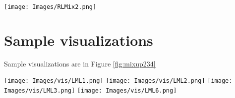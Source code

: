 \documentclass[letterpaper]{article} \usepackage[submission]{aaai23}  \usepackage{times}  \usepackage{helvet}  \usepackage{courier}  \usepackage[hyphens]{url}  \usepackage{graphicx} \urlstyle{rm} \def\UrlFont{\rm}  \usepackage{natbib}  \usepackage{caption} \frenchspacing  \setlength{\pdfpagewidth}{8.5in} \setlength{\pdfpageheight}{11in}
\begin{document}
\begin{figure*}[t]
  \centering
  \texttt{[image: Images/RLMix2.png]}
  \caption{Training pipeline of R-Mix. First, it calculates the saliency map, then divies the map into two regions. Next, it mixes the images based on the region the patch belongs to. Finally, it combines the number of patches and mixing ratio to determine the weights of the inputs.}
  \label{fig:pipeline}
\end{figure*}

\section*{Sample visualizations}
Sample visualizations are in Figure \ref{fig:mixup234}
\begin{figure*}[t]
  \centering
  \texttt{[image: Images/vis/LML1.png]}
  \texttt{[image: Images/vis/LML2.png]}
  \texttt{[image: Images/vis/LML3.png]}
  \texttt{[image: Images/vis/LML6.png]}
  \caption{Sample visualization of images produced by R-Mix. }
  \label{fig:mixup234}
\end{figure*}
\end{document}
